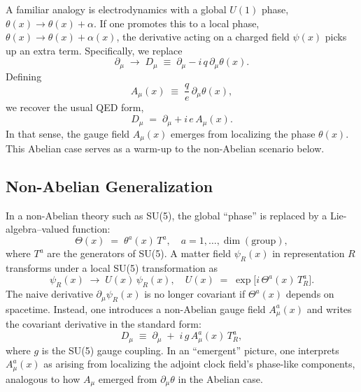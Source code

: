 \documentclass[aps,prd,preprint,groupedaddress]{revtex4-2}
\begin{document}
A familiar analogy is electrodynamics with a global $U(1)$ phase, $\theta(x)\rightarrow \theta(x) + \alpha$. If one promotes this to a local phase, $\theta(x)\rightarrow \theta(x)+\alpha(x)$, the derivative acting on a charged field $\psi(x)$ picks up an extra term. Specifically, we replace
\begin{equation}
\partial_\mu \;\longrightarrow\; D_\mu \;\equiv\;
\partial_\mu - i\,q \,\partial_\mu \theta(x).
\label{eq:abelian-cov-deriv}
\end{equation}
Defining
\begin{equation}
A_\mu(x) \;\equiv\; \frac{q}{e}\,\partial_\mu \theta(x),
\end{equation}
we recover the usual QED form,
\begin{equation}
D_\mu \;=\; \partial_\mu + i\,e\,A_\mu(x).
\end{equation}
In that sense, the gauge field $A_\mu(x)$ emerges from localizing the phase $\theta(x)$. This Abelian case serves as a warm-up to the non-Abelian scenario below.

\subsection{Non-Abelian Generalization}
\label{subsec:non-abelian}

In a non-Abelian theory such as SU(5), the global ``phase'' is replaced by a Lie-algebra--valued function:
\begin{equation}
\Theta(x) \;=\; \theta^a(x)\,T^a,
\quad a=1,\dots,\dim(\text{group}),
\end{equation}
where $T^a$ are the generators of SU(5). A matter field $\psi_R(x)$ in representation $R$ transforms under a local SU(5) transformation as
\[  
\psi_R(x) \;\longrightarrow\; U(x)\,\psi_R(x),
\quad
U(x)\;=\;\exp\!\bigl[i\,\Theta^a(x)\,T^a_R\bigr].
\]
The naive derivative $\partial_\mu \psi_R(x)$ is no longer covariant if $\Theta^a(x)$ depends on spacetime. Instead, one introduces a non-Abelian gauge field $A_\mu^a(x)$ and writes the covariant derivative in the standard form:
\begin{equation}
D_\mu \;\equiv\;
\partial_\mu \;+\; i\,g\,A_\mu^a(x)\,T^a_R,
\end{equation}
where $g$ is the SU(5) gauge coupling. In an ``emergent'' picture, one interprets $A_\mu^a(x)$ as arising from localizing the adjoint clock field's phase-like components, analogous to how $A_\mu$ emerged from $\partial_\mu \theta$ in the Abelian case. 
\end{document}
